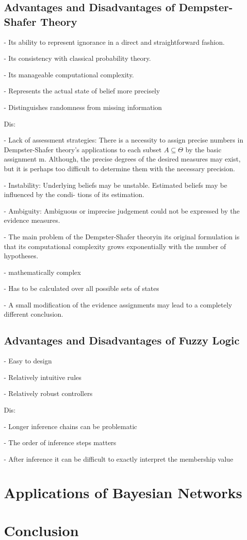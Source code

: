 \documentclass[11pt]{article}
\begin{document}
\subsection{Advantages and Disadvantages of Dempster-Shafer Theory}

- Its ability to represent ignorance in a direct and straightforward fashion.

- Its consistency with classical probability theory.

- Its manageable computational complexity.

- Represents the actual state of belief more precisely

- Distinguishes randomness from missing information

Dis:

- Lack of assessment strategies: There is a necessity to assign precise numbers
in Dempster-Shafer theory's applications to each subset $A \subseteq \Theta$ by
the basic assignment m. Although, the precise degrees of the desired measures
may exist, but it is perhaps too difficult to determine them with the necessary
precision.

- Instability: Underlying beliefs may be unstable. Estimated beliefs may be
influenced by the condi- tions of its estimation.

- Ambiguity: Ambiguous or imprecise judgement could not be expressed by the
evidence measures.

- The main problem of the Dempster-Shafer theoryin its original formulation is
that its computational complexity grows exponentially with the number of
hypotheses.

- mathematically complex

- Has to be calculated over all possible sets of states

- A small modification of the evidence assignments may lead to a completely
different conclusion.

\subsection{Advantages and Disadvantages of Fuzzy Logic}

- Easy to design 

- Relatively intuitive rules 

- Relatively robust controllers 

Dis:

- Longer inference chains can be problematic 

- The order of inference steps matters

- After inference it can be difficult to exactly interpret the membership value 


\section{Applications of Bayesian Networks}

\section{Conclusion}



\end{document}
